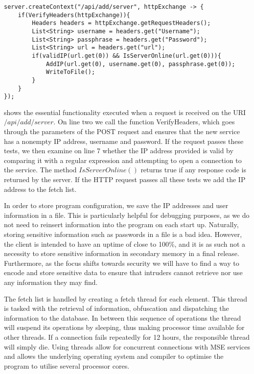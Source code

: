 \begin{lstlisting}[caption={Adding a server to the fetch list},label={lst:add_server},language=inc_Java, mathescape]
server.createContext("/api/add/server", httpExchange -> {
    if(VerifyHeaders(httpExchange)){
        Headers headers = httpExchange.getRequestHeaders();
        List<String> username = headers.get("Username");
        List<String> passphrase = headers.get("Password");
        List<String> url = headers.get("url");
        if(validIP(url.get(0)) && IsServerOnline(url.get(0))){
            AddIP(url.get(0), username.get(0), passphrase.get(0));
            WriteToFile();
        }
    }
});
\end{lstlisting}
 shows the essential functionality executed when a request is received on the URI $/api/add/server$. On line two we call the function VerifyHeaders, which goes through the parameters of the POST request and ensures that the new service has a nonempty IP address, username and password. If the request passes these tests, we then examine on line 7 whether the IP address provided is valid by comparing it with a regular expression and attempting to open a connection to the service. The method $IsServerOnline()$ returns true if any response code is returned by the server. If the HTTP request passes all these tests we add the IP address to the fetch list.

In order to store program configuration, we save the IP addresses and user information in a file. This is particularly helpful for debugging purposes, as we do not need to reinsert information into the program on each start up. Naturally, storing sensitive information such as passwords in a file is a bad idea. However, the client is intended to have an uptime of close to 100\%, and it is as such not a necessity to store sensitive information in secondary memory in a final release. Furthermore, as the focus shifts towards security we will have to find a way to encode and store sensitive data to ensure that intruders cannot retrieve nor use any information they may find.

The fetch list is handled by creating a fetch thread for each element. This thread is tasked with the retrieval of information, obfuscation and dispatching the information to the database. In between this sequence of operations the thread will suspend its operations by sleeping, thus making processor time available for other threads. If a connection fails repeatedly for 12 hours, the responsible thread will simply die. Using threads allow for concurrent connections with MSE services and allows the underlying operating system and compiler to optimise the program to utilise several processor cores.
